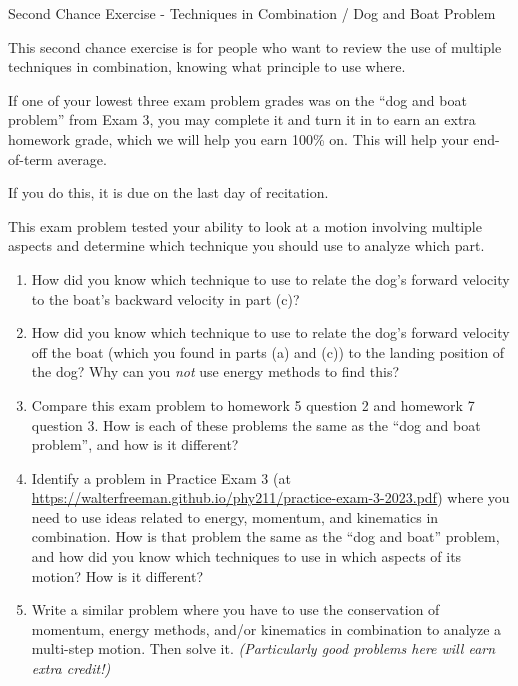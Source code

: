 \documentclass[12pt]{article}
\begin{document}
\begin{center}
\Large
\sc Second Chance Exercise - Techniques in Combination / Dog and Boat Problem \rm





\normalsize
This second chance exercise is for people who want to review the use of multiple techniques in combination, knowing what principle to use where.

If one of your lowest three exam problem grades was on the ``dog and boat problem'' from Exam 3, you may complete it and turn it in to earn an extra homework grade, which we will help you earn 100\% on. This will help your end-of-term average.

If you do this, it is due on the last day of recitation.

\end{center}

\vspace{1.5in}

This exam problem tested your ability to look at a motion involving multiple aspects and determine which technique you should use to analyze which part.

\begin{enumerate}
	
		\item How did you know which technique to use to relate the dog's forward velocity to the boat's backward velocity in part (c)?
		
		\item How did you know which technique to use to relate the dog's forward velocity off the boat (which you found in parts (a) and (c)) to the landing position of the dog? Why can you {\it not} use energy methods to find this?
	
		\item Compare this exam problem to homework 5 question 2 and homework 7 question 3. How is each of these problems the same as the ``dog and boat problem'', and how is it different?


	\item Identify a problem in Practice Exam 3 (at \url{https://walterfreeman.github.io/phy211/practice-exam-3-2023.pdf}) where you need to use ideas related to energy, momentum, and kinematics in combination. How is that problem the same as the ``dog and boat'' problem, and how did you know which techniques to use in which aspects of its motion? How is it different?
	

	
    \item Write a similar problem where you have to use the conservation of momentum, energy methods, and/or kinematics in combination to analyze a multi-step motion. Then solve it. {\it (Particularly good problems here will earn extra credit!)}
\end{enumerate}
\end{document}
